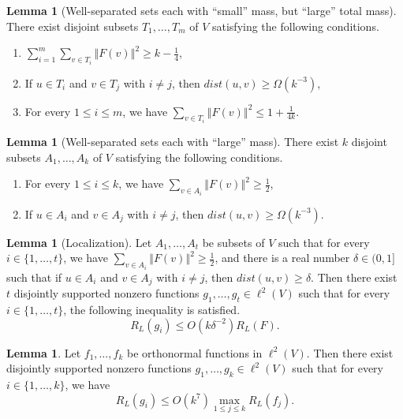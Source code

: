 \documentclass[12pt,a4paper,bold]{thesis}
\theoremstyle{definition}
\newtheorem{lemma}[thm]{Lemma}
\newcommand*{\norm}[2][]{\left\Vert #2 \right\Vert_{#1}}
\begin{document}
\begin{lemma}[Well-separated sets each with ``small'' mass, but ``large'' total mass]
\label{lem:small-separated}
    There exist disjoint subsets $T_1, \dots, T_m$ of $V$ satisfying the following conditions.
    \begin{enumerate}[label=(\alph*)]
        \item $\sum_{i=1}^{m} \sum_{v \in T_i} \norm{F(v)}^2 \geq k - \frac{1}{4}$,
        \item If $u \in T_i$ and $v \in T_j$ with $i \neq j$, then $dist(u,v) \geq \Omega(k^{-3})$,
        \item For every $1 \leq i \leq m$, we have $\sum_{v \in T_i} \norm{F(v)}^2 
        \leq 1 + \frac{1}{4k}$.
    \end{enumerate}
\end{lemma}

\begin{lemma}[Well-separated sets each with ``large'' mass] \label{lem:large-separated}
    There exist $k$ disjoint subsets $A_1, \dots, A_k$ of $V$ satisfying the following conditions.
    \begin{enumerate}[label=(\alph*)]
        \item For every $1 \leq i \leq k$, we have $\sum_{v \in A_i} \norm{F(v)}^2 \geq \frac{1}{2}$,
        \item If $u \in A_i$ and $v \in A_j$ with $i \neq j$, then $dist(u,v) \geq \Omega(k^{-3})$.
    \end{enumerate} 
\end{lemma}

\begin{lemma}[Localization] \label{lem:localization}
    Let $A_1, \dots, A_t$ be subsets of $V$ such that for every $i \in \{1, \dots, t\}$, 
    we have $\sum_{v \in A_i} \norm{F(v)}^2 \geq \frac{1}{2}$, and there is a 
    real number $\delta \in (0,1]$ such that if $u \in A_i$ and $v \in A_j$ 
    with $i \neq j$, then $dist(u,v) \geq \delta$. Then there exist $t$ disjointly supported
    nonzero functions $g_1, \dots, g_t \in \ell^2(V)$ such that for every 
    $i \in \{1, \dots, t\}$, the following inequality is satisfied.
    \begin{equation*}
        R_L(g_i) \leq O(k \delta^{-2}) R_L(F).
    \end{equation*}
\end{lemma}

\begin{lemma} \label{lem:main-lemma}
    Let $f_1, \dots, f_k$ be orthonormal functions in $\ell^2(V)$. Then there exist
    disjointly supported nonzero functions $g_1, \dots, g_k \in \ell^2(V)$
    such that for every $i \in \{1, \dots, k\}$, we have
    \begin{equation*}
        R_L(g_i) \leq O(k^7) \max_{1 \leq j \leq k} R_L(f_j).
    \end{equation*}
\end{lemma}
\end{document}
